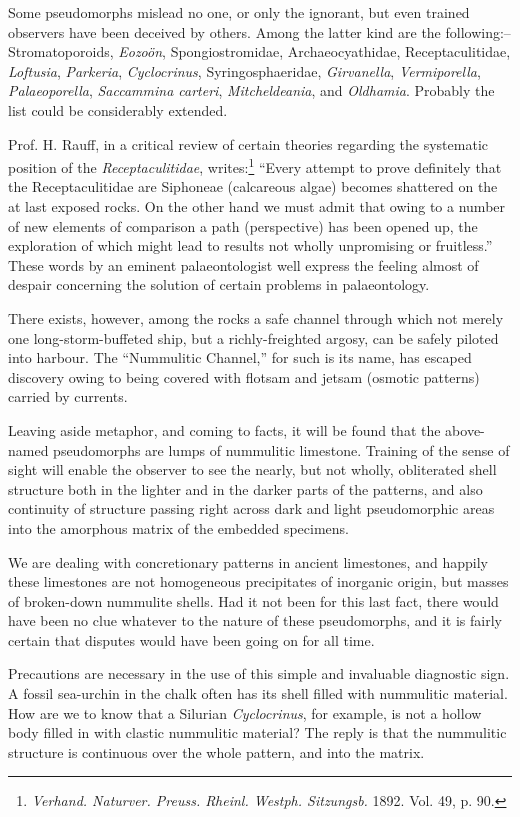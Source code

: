 \documentclass[a4paper, 12pt, oneside]{article}
\begin{document}
Some pseudomorphs mislead no one, or only the ignorant, but even trained observers have been deceived by others. Among the latter kind are the following:-- Stromatoporoids, \emph{Eozoön}, Spongiostromidae, Archaeocyathidae, Receptaculitidae, \emph{Loftusia}, \emph{Parkeria}, \emph{Cyclocrinus}, Syringosphaeridae, \emph{Girvanella}, \emph{Vermiporella}, \emph{Palaeoporella}, \emph{Saccammina carteri}, \emph{Mitcheldeania}, and \emph{Oldhamia}. Probably the list could be considerably extended.

Prof. H. Rauff, in a critical review of certain theories regarding the systematic position of the \emph{Receptaculitidae}, writes:\footnote{\emph{Verhand. Naturver. Preuss. Rheinl. Westph. Sitzungsb.} 1892. Vol. 49, p. 90.} ``Every attempt to prove definitely that the Receptaculitidae are Siphoneae (calcareous algae) becomes shattered on the at last exposed rocks. On the other hand we must admit that owing to a number of new elements of comparison a path (perspective) has been opened up, the exploration of which might lead to results not wholly unpromising or fruitless.'' These words by an eminent palaeontologist well express the feeling almost of despair concerning the solution of certain problems in palaeontology.

There exists, however, among the rocks a safe channel through which not merely one long-storm-buffeted ship, but a richly-freighted argosy, can be safely piloted into harbour. The ``Nummulitic Channel,'' for such is its name, has escaped discovery owing to being covered with flotsam and jetsam (osmotic patterns) carried by currents.

Leaving aside metaphor, and coming to facts, it will be found that the above-named pseudomorphs are lumps of nummulitic limestone. Training of the sense of sight will enable the observer to see the nearly, but not wholly, obliterated shell structure both in the lighter and in the darker parts of the patterns, and also continuity of structure passing right across dark and light pseudomorphic areas into the amorphous matrix of the embedded specimens.

We are dealing with concretionary patterns in ancient limestones, and happily these limestones are not homogeneous precipitates of inorganic origin, but masses of broken-down nummulite shells. Had it not been for this last fact, there would have been no clue whatever to the nature of these pseudomorphs, and it is fairly certain that disputes would have been going on for all time.

Precautions are necessary in the use of this simple and invaluable diagnostic sign. A fossil sea-urchin in the chalk often has its shell filled with nummulitic material. How are we to know that a Silurian \emph{Cyclocrinus}, for example, is not a hollow body filled in with clastic nummulitic material? The reply is that the nummulitic structure is continuous over the whole pattern, and into the matrix.
\end{document}
